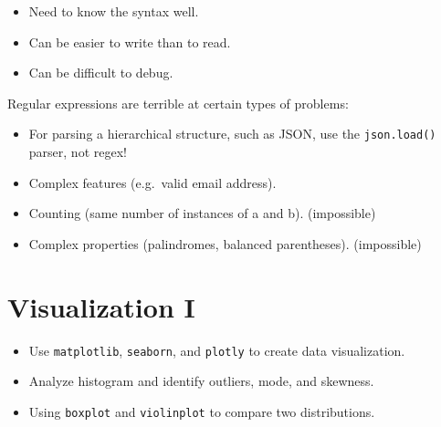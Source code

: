 \documentclass[
  letterpaper,
  DIV=11,
  numbers=noendperiod]{scrreprt}
\providecommand{\tightlist}{%
  \setlength{\itemsep}{0pt}\setlength{\parskip}{0pt}}\usepackage{longtable,booktabs,array}
\begin{document}
\begin{itemize}
\tightlist
\item
  Need to know the syntax well.
\item
  Can be easier to write than to read.
\item
  Can be difficult to debug.
\end{itemize}

Regular expressions are terrible at certain types of problems:

\begin{itemize}
\tightlist
\item
  For parsing a hierarchical structure, such as JSON, use the
  \texttt{json.load()} parser, not regex!
\item
  Complex features (e.g.~valid email address).
\item
  Counting (same number of instances of a and b). (impossible)
\item
  Complex properties (palindromes, balanced parentheses). (impossible)
\end{itemize}


\hypertarget{visualization-i}{%
\chapter{Visualization I}\label{visualization-i}}

\begin{tcolorbox}[enhanced jigsaw, rightrule=.15mm, opacityback=0, colbacktitle=quarto-callout-note-color!10!white, opacitybacktitle=0.6, coltitle=black, toptitle=1mm, colback=white, toprule=.15mm, leftrule=.75mm, breakable, bottomtitle=1mm, bottomrule=.15mm, arc=.35mm, title=\textcolor{quarto-callout-note-color}{\faInfo}\hspace{0.5em}{Note}, colframe=quarto-callout-note-color-frame, titlerule=0mm, left=2mm]

\begin{itemize}
\tightlist
\item
  Use \texttt{matplotlib}, \texttt{seaborn}, and \texttt{plotly} to
  create data visualization.
\item
  Analyze histogram and identify outliers, mode, and skewness.
\item
  Using \texttt{boxplot} and \texttt{violinplot} to compare two
  distributions.
\end{itemize}

\end{tcolorbox}
\end{document}
